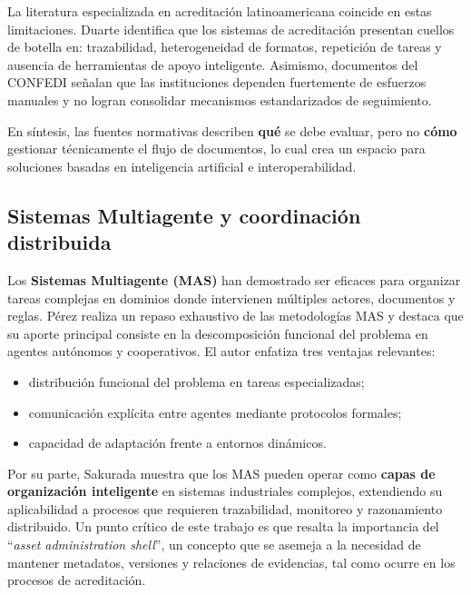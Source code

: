 \documentclass[12pt]{article}
\let\cite\citep
\begin{document}
La literatura especializada en acreditación latinoamericana coincide en estas limitaciones.  
Duarte \cite{duarte2023literature} identifica que los sistemas de acreditación presentan cuellos de botella en: trazabilidad, heterogeneidad de formatos, repetición de tareas y ausencia de herramientas de apoyo inteligente.  
Asimismo, documentos del CONFEDI \cite{sanchez2022acreditacion} señalan que las instituciones dependen fuertemente de esfuerzos manuales y no logran consolidar mecanismos estandarizados de seguimiento.

En síntesis, las fuentes normativas describen \textbf{qué} se debe evaluar, pero no \textbf{cómo} gestionar técnicamente el flujo de documentos, lo cual crea un espacio para soluciones basadas en inteligencia artificial e interoperabilidad.

\subsection{Sistemas Multiagente y coordinación distribuida}

Los \textbf{Sistemas Multiagente (MAS)} han demostrado ser eficaces para organizar tareas complejas en dominios donde intervienen múltiples actores, documentos y reglas.  
Pérez \cite{perez2022breve} realiza un repaso exhaustivo de las metodologías MAS y destaca que su aporte principal consiste en la descomposición funcional del problema en agentes autónomos y cooperativos. El autor enfatiza tres ventajas relevantes:

\begin{itemize}
    \item distribución funcional del problema en tareas especializadas;
    \item comunicación explícita entre agentes mediante protocolos formales;
    \item capacidad de adaptación frente a entornos dinámicos.
\end{itemize}

Por su parte, Sakurada \cite{sakurada2021multi} muestra que los MAS pueden operar como \textbf{capas de organización inteligente} en sistemas industriales complejos, extendiendo su aplicabilidad a procesos que requieren trazabilidad, monitoreo y razonamiento distribuido.  
Un punto crítico de este trabajo es que resalta la importancia del “\textit{asset administration shell}”, un concepto que se asemeja a la necesidad de mantener metadatos, versiones y relaciones de evidencias, tal como ocurre en los procesos de acreditación.
\end{document}
